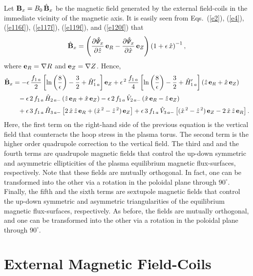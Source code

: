 \documentclass[12pt,prb,aps]{revtex4-1}
\begin{document}
Let ${\bf B}_x= B_0\,\hat{\bf B}_x$ be the magnetic field generated by the external field-coils in the immediate vicinity of the
magnetic axis. It is easily seen from Eqs.~(\ref{e2}), (\ref{e4}),  (\ref{e116f}), (\ref{e117f}), (\ref{e119f}), and (\ref{e120f})  that
\begin{equation}
\hat{\bf B}_x = \left(\frac{\partial\hat{\mit\Psi}_x}{\partial\hat{z}}\,{\bf e}_R-\frac{\partial\hat{\mit\Psi}_x}{\partial\hat{x}}\,{\bf e}_Z\right)\left(1+\epsilon\,\hat{x}\right)^{-1},
\end{equation}
where ${\bf e}_R =\nabla R$ and ${\bf e}_Z=\nabla Z$. Hence,
\begin{align}
\hat{\bf B}_x&= - \epsilon\,\frac{f_{1\,a}}{2}\left[\ln\left(\frac{8}{\epsilon}\right)-\frac{3}{2}+\hat{H}_{1\,a}'\right]{\bf e}_Z+ \epsilon^{\,2}\,\frac{f_{1\,a}}{4}\left[\ln\left(\frac{8}{\epsilon}\right)-\frac{3}{2}+\hat{H}_{1\,a}'\right](\hat{z}\,{\bf e}_R +\hat{x}\,{\bf e}_Z)\nonumber\\[0.5ex]
&\phantom{=} - \epsilon\,2\,f_{1\,a}\,\hat{H}_{2\,a-}\,(\hat{z}\,{\bf e}_R+\hat{x}\,{\bf e}_Z)
- \epsilon\,2\,f_{1\,a}\,\hat{V}_{2\,a-}\,(\hat{x}\,{\bf e}_R-\hat{z}\,{\bf e}_Z)\\[0.5ex]
&\phantom{=} + \epsilon\,3\,f_{1\,a}\,\hat{H}_{3\,a-}\left[2\,\hat{x}\,\hat{z}\,{\bf e}_R + (\hat{x}^{\,2}-\hat{z}^{\,2})\,{\bf e}_Z\right]
 + \epsilon\,3\,f_{1\,a}\,\hat{V}_{3\,a-}\left[ (\hat{x}^{\,2}-\hat{z}^{\,2})\,{\bf e}_Z-2\,\hat{x}\,\hat{z}\,{\bf e}_R\right].\nonumber
\end{align}
 Here, the first term on the 
right-hand side of the previous equation is the vertical field that counteracts the hoop stress in the plasma torus.\cite{greene,fred} The second term is the
higher order quadrupole correction to the vertical field. 
The third and and the fourth
terms are quadrupole magnetic fields that control the up-down symmetric and asymmetric ellipticities of the plasma equilibrium magnetic flux-surfaces, respectively.
Note that these fields are mutually orthogonal. In fact, one can be transformed into the other via a rotation in the poloidal plane through $90^\circ$. 
Finally, the fifth and the sixth terms are sextupole magnetic fields that control the  up-down symmetric and asymmetric triangularities of the equilibrium magnetic
flux-surfaces, respectively. As before, the fields are mutually orthogonal, and one can be transformed into the other via a rotation in the poloidal plane through $90^\circ$. 

\section{External Magnetic Field-Coils}\label{scoil}
\end{document}
